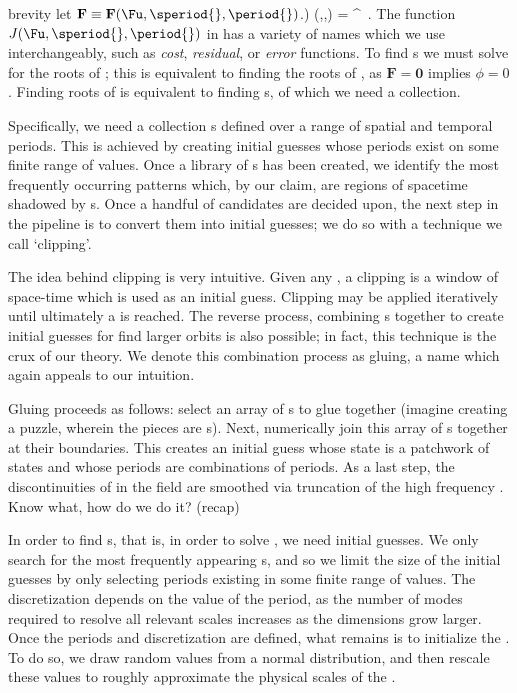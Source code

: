 brevity let $\mathbf{F}\equiv\mathbf{F}(\Fu,\speriod{},\period{})$.)
\beq \label{e-cost}
\phi(\Fu,\speriod{},\period{}) = ^{\top} \,.
\eeq
The function
$J(\Fu,\speriod{},\period{})$ 
in
 has a variety of names which we use
interchangeably, such as \textit{cost}, \textit{residual}, or
\textit{error} functions. %
To find
{\po}s we must solve for the roots of ; this is equivalent
to finding the roots of , as $\mathbf{F}=\mathbf{0}$
implies $\phi=0$. Finding roots of  is equivalent to finding
{\po}s, of which we need a collection.


Specifically, we need a collection {\po}s
defined over a range of spatial and temporal periods. This is achieved by creating
initial guesses whose periods exist on some finite range of values.
Once a library of {\po}s has been created, we identify the most frequently
occurring patterns which, by our claim,
are regions of spacetime shadowed by {\fpo}s. Once a handful of {\fpo}
candidates are decided upon, the next step in the {\spt} pipeline is to convert
them into initial guesses; we do so with a technique we call `clipping'.

The idea behind clipping is very intuitive. Given any {\po}, a clipping is a window
of space-time which is used as an initial guess.
Clipping may be applied iteratively until ultimately a {\fpo} is reached.
The reverse process, combining {\fpo}s together
to create initial guesses for find larger orbits is also possible; in fact,
this technique is the crux of our theory. We denote this combination process as
gluing, a name which again appeals to our intuition.

Gluing proceeds as follows: select an array of {\fpo}s to glue
together (imagine creating a puzzle, wherein the pieces are {\fpo}s). Next, numerically
join this array of {\fpo}s together at their boundaries. This creates an initial guess whose
state is a patchwork of {\fpo} states and whose periods
are combinations of {\fpo} periods. As a last step, the discontinuities
of in the field are smoothed via truncation of the high frequency {\spt} {\Fcs}.
Know what, how do we do it? (recap)

In order to find {\po}s, that is, in order to solve , we
need initial guesses. We only search for the most frequently appearing {\fpo}s,
and so we limit the size of the initial guesses by only selecting periods existing
in some finite range of values. The discretization depends on
the value of the period, as the number of modes required to resolve all relevant scales increases
as the dimensions grow larger. Once the periods and discretization are defined,
what remains is to initialize the {\spt} {\Fcs}. To do so, we draw random
values from a normal distribution, and then rescale these values to roughly
approximate the physical scales of the \KSe.

